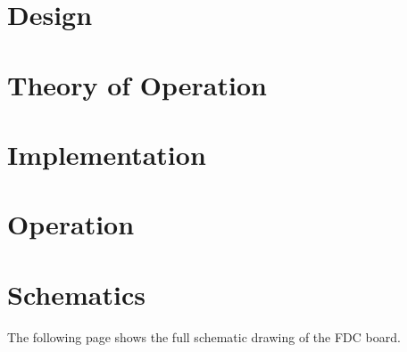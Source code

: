 
\section{Design}

\section{Theory of Operation}

\section{Implementation}

\section{Operation}

\section{Schematics}

The following page shows the full schematic drawing of the FDC
board.

\cleardoublepage
{}
